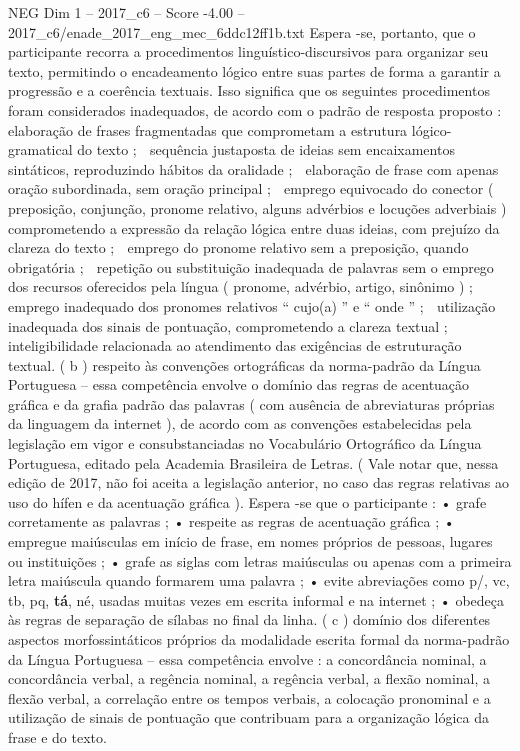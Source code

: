 \begin{textsample}{NEG Dim 1 – 2017\_c6 – Score -4.00 – 2017\_c6/enade\_2017\_eng\_mec\_6ddc12ff1b.txt}
Espera -se, portanto, que o participante recorra a procedimentos linguístico-discursivos para organizar seu texto, permitindo o encadeamento lógico entre suas partes de forma a garantir a progressão e a coerência textuais.
Isso significa que os seguintes procedimentos foram considerados inadequados, de acordo com o padrão de resposta proposto :  elaboração de frases fragmentadas que comprometam a estrutura lógico-gramatical do texto ;  sequência justaposta de ideias sem encaixamentos sintáticos, reproduzindo hábitos da oralidade ;  elaboração de frase com apenas oração subordinada, sem oração principal ;  emprego equivocado do conector ( preposição, conjunção, pronome relativo, alguns advérbios e locuções adverbiais ) comprometendo a expressão da relação lógica entre duas ideias, com prejuízo da clareza do texto ;  emprego do pronome relativo sem a preposição, quando obrigatória ;  repetição ou substituição inadequada de palavras sem o emprego dos recursos oferecidos pela língua ( pronome, advérbio, artigo, sinônimo ) ;  emprego inadequado dos pronomes relativos “ cujo(a) ” e “ onde ” ;  utilização inadequada dos sinais de pontuação, comprometendo a clareza textual ;  inteligibilidade relacionada ao atendimento das exigências de estruturação textual. ( b ) respeito às convenções ortográficas da norma-padrão da Língua Portuguesa – essa competência envolve o domínio das regras de acentuação gráfica e da grafia padrão das palavras ( com ausência de abreviaturas próprias da linguagem da internet ), de acordo com as convenções estabelecidas pela legislação em vigor e consubstanciadas no Vocabulário Ortográfico da Língua Portuguesa, editado pela Academia Brasileira de Letras. ( Vale notar que, nessa edição de 2017, não foi aceita a legislação anterior, no caso das regras relativas ao uso do hífen e da acentuação gráfica ).
Espera -se que o participante : • grafe corretamente as palavras ; • respeite as regras de acentuação gráfica ; • empregue maiúsculas em início de frase, em nomes próprios de pessoas, lugares ou instituições ; • grafe as siglas com letras maiúsculas ou apenas com a primeira letra maiúscula quando formarem uma palavra ; • evite abreviações como p/, vc, tb, pq, \textbf{tá}, né, usadas muitas vezes em escrita informal e na internet ; • obedeça às regras de separação de sílabas no final da linha. ( c ) domínio dos diferentes aspectos morfossintáticos próprios da modalidade escrita formal da norma-padrão da Língua Portuguesa – essa competência envolve : a concordância nominal, a concordância verbal, a regência nominal, a regência verbal, a flexão nominal, a flexão verbal, a correlação entre os tempos verbais, a colocação pronominal e a utilização de sinais de pontuação que contribuam para a organização lógica da frase e do texto.

\end{textsample}
